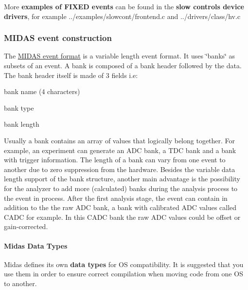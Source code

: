 More {\bfseries examples of FIXED events} can be found in the {\bfseries slow controls device drivers}, for example ../examples/slowcont/frontend.c and ../drivers/class/hv.c

\par
 

 \par
 \label{FE_bank_construction_idx_event_readout_format_midas}
\hypertarget{FE_bank_construction_idx_event_readout_format_midas}{}
 \label{FE_bank_construction_idx_Midas_event-construction}
\hypertarget{FE_bank_construction_idx_Midas_event-construction}{}
 \hypertarget{FE_bank_construction_FE_MIDAS_event_construction}{}\subsubsection{MIDAS event construction}\label{FE_bank_construction_FE_MIDAS_event_construction}
The \hyperlink{FE_Data_format_FE_Midas_format}{MIDAS event format} is a variable length event format. It uses \char`\"{}banks\char`\"{} as subsets of an event. A bank is composed of a bank header followed by the data. The bank header itself is made of 3 fields i.e:
\begin{DoxyItemize}
\item bank name (4 characters)
\item bank type
\item bank length
\end{DoxyItemize}

Usually a bank contains an array of values that logically belong together. For example, an experiment can generate an ADC bank, a TDC bank and a bank with trigger information. The length of a bank can vary from one event to another due to zero suppression from the hardware. Besides the variable data length support of the bank structure, another main advantage is the possibility for the analyzer to add more (calculated) banks during the analysis process to the event in process. After the first analysis stage, the event can contain in addition to the the raw ADC bank, a bank with calibrated ADC values called CADC for example. In this CADC bank the raw ADC values could be offset or gain-\/corrected.



\hypertarget{FE_bank_construction_FE_Midas_Data_Types}{}\paragraph{Midas Data Types}\label{FE_bank_construction_FE_Midas_Data_Types}
Midas defines its own {\bfseries  data types } for OS compatibility. It is suggested that you use them in order to ensure correct compilation when moving code from one OS to another.

